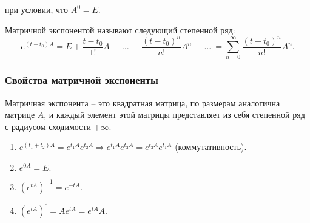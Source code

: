 при условии, что $A^0 = E.$

\begin{definition}
    Матричной экспонентой называют следующий степенной ряд:
    \begin{equation*}
        e^{(t-t_0)A} = E + \frac{t-t_0}{1!}A +\ \dots\ + \frac{(t-t_0)^n}{n!}A^n+\ \dots\ = \sum\limits_{n = 0}^{\infty} \frac{(t-t_0)^n}{n!}A^n.
    \end{equation*}
\end{definition}

\subsubsection{Свойства матричной экспоненты}

Матричная экспонента -- это квадратная матрица, по размерам аналогична матрице $A$, и каждый элемент этой матрицы представляет из себя степенной ряд с радиусом сходимости $+\infty$.

\begin{enumerate}
    \item $e^{(t_1+t_2)A} = e^{t_1A}e^{t_2A} \Rightarrow e^{t_1A}e^{t_2A} = e^{t_2A}e^{t_1A}$ (коммутативность).
    \item $ e^{0 A} = E.$	
    \item $\left(e^{tA}\right)^{-1} = e^{-tA}.$
    \item $(e^{tA})^{'} = A e^{tA} = e^{tA}A.$
\end{enumerate}

